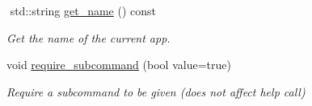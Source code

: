 \begin{DoxyCompactItemize}
$$\mbox{\label{class_c_l_i_1_1_app_a4b40e301840ec5d6f99129e6d0a0b2e9}} 
std\+::string \hyperlink{class_c_l_i_1_1_app_a4b40e301840ec5d6f99129e6d0a0b2e9}{get\+\_\+name} () const
\begin{DoxyCompactList}\small\item\em Get the name of the current app. \end{DoxyCompactList}\item 
\mbox{\label{class_c_l_i_1_1_app_adc3abfe0f615fa1d11b26e417acb4846}} 
void \hyperlink{class_c_l_i_1_1_app_adc3abfe0f615fa1d11b26e417acb4846}{require\+\_\+subcommand} (bool value=true)
\begin{DoxyCompactList}\small\item\em Require a subcommand to be given (does not affect help call) \end{DoxyCompactList}\end{DoxyCompactItemize}
